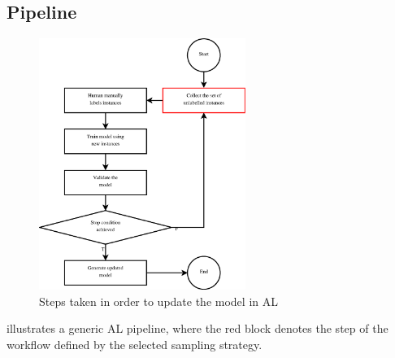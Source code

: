 \documentclass{scrartcl}
\begin{document}
  \subsection{Pipeline} \label{subsec:pipeline}

    \begin{figure}[ht]
      \centering
      \includegraphics[width=0.6\textwidth]{./figures/AL_pipeline.eps}
      \caption{Steps taken in order to update the model in AL \autocite{mosqueira2023human}}
      \label{fig:AL_pipeline}
    \end{figure}

     illustrates a generic AL pipeline, where the red block denotes the step of the workflow defined by the selected sampling strategy.
\end{document}
